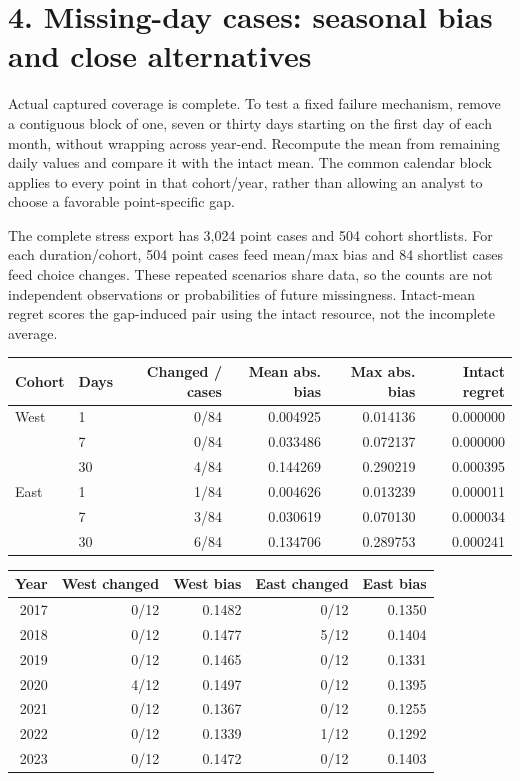 \documentclass[10pt,letterpaper]{article}
\begin{document}
\section*{4. Missing-day cases: seasonal bias and close alternatives}
Actual captured coverage is complete. To test a fixed failure mechanism, remove a contiguous block of one, seven or thirty days starting on the first day of each month, without wrapping across year-end. Recompute the mean from remaining daily values and compare it with the intact mean. The common calendar block applies to every point in that cohort/year, rather than allowing an analyst to choose a favorable point-specific gap.

The complete stress export has 3,024 point cases and 504 cohort shortlists. For each duration/cohort, 504 point cases feed mean/max bias and 84 shortlist cases feed choice changes. These repeated scenarios share data, so the counts are not independent observations or probabilities of future missingness. Intact-mean regret scores the gap-induced pair using the intact resource, not the incomplete average.
\begin{center}\small\begin{tabular}{llrrrr}\toprule
Cohort & Days & Changed / cases & Mean abs. bias & Max abs. bias & Intact regret\\\midrule
West & 1 & 0/84 & 0.004925 & 0.014136 & 0.000000 \\
 & 7 & 0/84 & 0.033486 & 0.072137 & 0.000000 \\
 & 30 & 4/84 & 0.144269 & 0.290219 & 0.000395 \\
East & 1 & 1/84 & 0.004626 & 0.013239 & 0.000011 \\
 & 7 & 3/84 & 0.030619 & 0.070130 & 0.000034 \\
 & 30 & 6/84 & 0.134706 & 0.289753 & 0.000241 \\
\bottomrule\end{tabular}\end{center}
\begin{center}\small\begin{tabular}{rrrrr}\toprule
Year & West changed & West bias & East changed & East bias\\\midrule
2017 & 0/12 & 0.1482 & 0/12 & 0.1350 \\
2018 & 0/12 & 0.1477 & 5/12 & 0.1404 \\
2019 & 0/12 & 0.1465 & 0/12 & 0.1331 \\
2020 & 4/12 & 0.1497 & 0/12 & 0.1395 \\
2021 & 0/12 & 0.1367 & 0/12 & 0.1255 \\
2022 & 0/12 & 0.1339 & 1/12 & 0.1292 \\
2023 & 0/12 & 0.1472 & 0/12 & 0.1403 \\
\bottomrule\end{tabular}\end{center}
\end{document}
